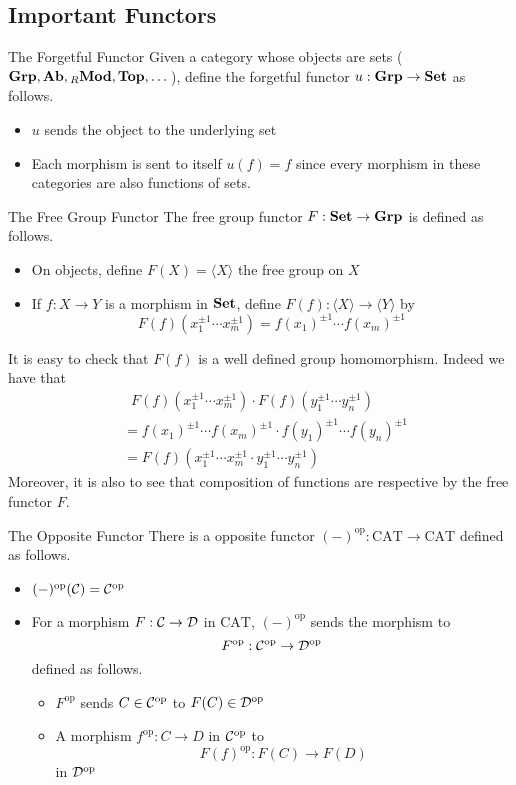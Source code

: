 \documentclass[a4paper]{article}
\begin{document}
\subsection{Important Functors}
\begin{defn}{The Forgetful Functor}{} Given a category whose objects are sets ($\bold{Grp},\bold{Ab},{_R}\bold{Mod},\bold{Top},\dots$), define the forgetful functor $u:\bold{Grp}\to\bold{Set}$ as follows. 
\begin{itemize}
\item $u$ sends the object to the underlying set
\item Each morphism is sent to itself $u(f)=f$ since every morphism in these categories are also functions of sets. 
\end{itemize}
\end{defn}

\begin{defn}{The Free Group Functor}{} The free group functor $F:\bold{Set}\to\bold{Grp}$ is defined as follows. 
\begin{itemize}
\item On objects, define $F(X)=\langle X\rangle$ the free group on $X$
\item If $f:X\to Y$ is a morphism in $\bold{Set}$, define $F(f):\langle X\rangle\to\langle Y\rangle$ by $$F(f)(x_1^{\pm1}\cdots x_m^{\pm1})=f(x_1)^{\pm1}\cdots f(x_m)^{\pm1}$$
\end{itemize}
\end{defn}

It is easy to check that $F(f)$ is a well defined group homomorphism. Indeed we have that 
\begin{align*}
&\;\;F(f)(x_1^{\pm1}\cdots x_m^{\pm1})\cdot F(f)(y_1^{\pm1}\cdots y_n^{\pm1})\\
&=f(x_1)^{\pm1}\cdots f(x_m)^{\pm1}\cdot f(y_1)^{\pm1}\cdots f(y_n)^{\pm1}\\
&=F(f)(x_1^{\pm1}\cdots x_m^{\pm1}\cdot y_1^{\pm1}\cdots y_n^{\pm1})
\end{align*}
Moreover, it is also to see that composition of functions are respective by the free functor $F$. 

\begin{defn}{The Opposite Functor}{} There is a opposite functor $(-)^\text{op}:\text{CAT}\to\text{CAT}$ defined as follows. 
\begin{itemize}
\item $(-)^\text{op}(\mathcal{C})=\mathcal{C}^\text{op}$
\item For a morphism $F:\mathcal{C}\to\mathcal{D}$ in $\text{CAT}$, $(-)^\text{op}$ sends the morphism to $$F^\text{op}:\mathcal{C}^\text{op}\to\mathcal{D}^\text{op}$$ defined as follows. 
\begin{itemize}
\item $F^\text{op}$ sends $C\in\mathcal{C}^\text{op}$ to $F(C)\in\mathcal{D}^\text{op}$
\item A morphism $f^\text{op}:C\to D$ in $\mathcal{C}^\text{op}$ to $$F(f)^\text{op}:F(C)\to F(D)$$ in $\mathcal{D}^\text{op}$
\end{itemize}
\end{itemize}
\end{defn}
\end{document}
